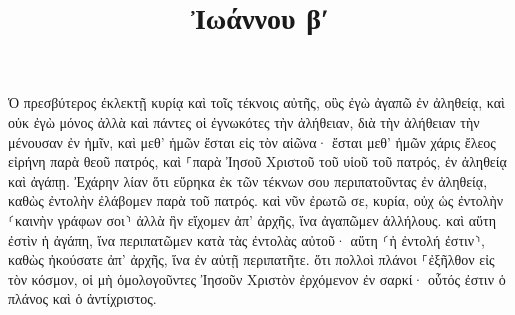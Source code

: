 \documentclass{openreader}
\title{Ἰωάννου βʹ}
\date{}
\begin{document}
\maketitle
\raggedbottom 
\fontsize{16pt}{24pt}\selectfont


Ὁ πρεσβύτερος ἐκλεκτῇ κυρίᾳ καὶ τοῖς τέκνοις αὐτῆς, οὓς ἐγὼ ἀγαπῶ ἐν ἀληθείᾳ, καὶ οὐκ ἐγὼ μόνος ἀλλὰ καὶ πάντες οἱ ἐγνωκότες τὴν ἀλήθειαν, 
διὰ τὴν ἀλήθειαν τὴν μένουσαν ἐν ἡμῖν, καὶ μεθ’ ἡμῶν ἔσται εἰς τὸν αἰῶνα· 
ἔσται μεθ’ ἡμῶν χάρις ἔλεος εἰρήνη παρὰ θεοῦ πατρός, καὶ ⸀παρὰ Ἰησοῦ Χριστοῦ τοῦ υἱοῦ τοῦ πατρός, ἐν ἀληθείᾳ καὶ ἀγάπῃ. 
Ἐχάρην λίαν ὅτι εὕρηκα ἐκ τῶν τέκνων σου περιπατοῦντας ἐν ἀληθείᾳ, καθὼς ἐντολὴν ἐλάβομεν παρὰ τοῦ πατρός. 
καὶ νῦν ἐρωτῶ σε, κυρία, οὐχ ὡς ἐντολὴν ⸂καινὴν γράφων σοι⸃ ἀλλὰ ἣν εἴχομεν ἀπ’ ἀρχῆς, ἵνα ἀγαπῶμεν ἀλλήλους. 
καὶ αὕτη ἐστὶν ἡ ἀγάπη, ἵνα περιπατῶμεν κατὰ τὰς ἐντολὰς αὐτοῦ· αὕτη ⸂ἡ ἐντολή ἐστιν⸃, καθὼς ἠκούσατε ἀπ’ ἀρχῆς, ἵνα ἐν αὐτῇ περιπατῆτε. 
ὅτι πολλοὶ πλάνοι ⸀ἐξῆλθον εἰς τὸν κόσμον, οἱ μὴ ὁμολογοῦντες Ἰησοῦν Χριστὸν ἐρχόμενον ἐν σαρκί· οὗτός ἐστιν ὁ πλάνος καὶ ὁ ἀντίχριστος. 
\end{document}
